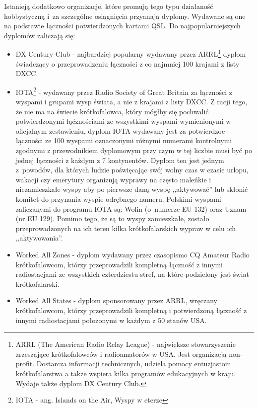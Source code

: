 \documentclass[]{mgr}
\begin{document}
                Istanieją dodatkowo organizacje, które promują tego typu działaność hobbystyczną i~za szczególne osiągnięcia przyanają dyplomy. Wydawane są one na podstawie łączności potwierdzonych kartami QSL. Do najpopularniejszych dyplomów zaliczają się:
                \begin{itemize}
                    \item DX Century Club - najbardziej popularny wydawany przez ARRL\footnote{ARRL (The American Radio Relay League) - największe stowarzyszenie zrzeszające krótkofalowców i radioamatorów w USA. Jest organizacją non-profit. Dostarcza informacji technicznych, udziela pomocy entuzjastom krótkofalarstwa a także wspiera kilka programów edukacyjnych w kraju. Wydaje także dyplom DX Century Club.} dyplom świadczący o przeprowadzeniu łączności z co najmniej 100 krajami z listy DXCC.
                    \item IOTA\footnote{IOTA - ang. Islands on the Air, Wyspy w eterze} - wydawany przez Radio Society of Great Britain za łączności z wyspami i grupami wysp świata, a nie z krajami z listy DXCC. Z racji tego, że nie ma na świecie krótkofalowca, który mógłby się pochwalić potwierdzonymi łąćznościami ze wszystkimi wyspami wymienionymi w oficjalnym zestawieniu, dyplom IOTA wydawany jest za potwierdzoe łączności ze 100 wyspami oznaczonymi różnymi numerami kontrolnymi zgodnymi z przewodnikiem dyplomowym przy czym w tej liczbie musi być po jednej łączności z każdym z 7 kontynentów. Dyplom ten jest jednym z~powodów, dla których ludzie poświęcając swój wolny czas w czasie urlopu, wakacji czy emerytury organizują wyprawy na często maleńkie i niezamieszkałe wyspy aby po pierwsze daną wyspę ,,aktywować'' lub skłonić komitet do przynania wyspie odrębnego numeru. Polskimi wyspami zaliczanymi do programu IOTA są: Wolin (o~numerze EU 132) oraz Uznam (nr EU 129). Pomimo tego, że są to wyspy zamieszkałe, zostało przeprowadzonych na ich teren kilka krótkofalarskich wypraw w celu ich ,,aktywowania''.
                    \item Worked All Zones - dyplom wydawany przez czasopismo CQ Amateur Radio krótkofalowcom, którzy przeprowadzili kompletną łączność z innymi radiostacjami ze wszystkich czterdziestu stref, na które podzielony jest świat krótkofalarski.
                    \item Worked All States - dyplom sponsorowany przez ARRL, wręczany krótkofalowcom, którzy przeprowadzili kompletną i potwierdzoną łączność z innymi radiostacjami położonymi w każdym z 50 stanów USA.
                \end{itemize}
\end{document}
